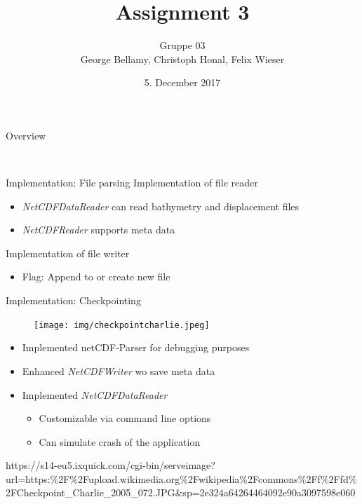 \documentclass[shortpres]{beamer}
\title[{Tsunami simulation}]{Assignment 3}
\author[Bellamy, Honal, Wieser]{Gruppe 03\\George Bellamy, Christoph Honal, Felix Wieser\\\vspace{10pt}{\small Bachelorpraktikum}}
\institute[TU M\"unchen]{Technical University of Munich}
\date{5. December 2017}
\begin{document}
\maketitle

\begin{frame}{Overview}
	\begin{figure}
		\hspace{40pt}
		\hspace{0pt}\vspace{20pt}\\
	\end{figure}
\end{frame}

\begin{frame}{Implementation: File parsing}
	Implementation of file reader
	\begin{itemize}
		\item \textit{NetCDFDataReader} can read bathymetry and displacement files
		\item \textit{NetCDFReader} supports meta data
	\end{itemize}
	\vspace{20pt}
	Implementation of file writer
	\begin{itemize}
		\item Flag: Append to or create new file
	\end{itemize}
\end{frame}

\begin{frame}{Implementation: Checkpointing}	
	\begin{figure}
		\texttt{[image: img/checkpointcharlie.jpeg]}
	\end{figure}
	
	\begin{itemize}
		\item Implemented netCDF-Parser for debugging purposes
		\item Enhanced \textit{NetCDFWriter} wo save meta data
		\item Implemented \textit{NetCDFDataReader}
		\begin{itemize}
			\item Customizable via command line options
			\item Can simulate crash of the application
		\end{itemize}
	\end{itemize}
	
	\vfill
	\flushleft
	{\fontsize{3.5}{3.5} \selectfont 
	https://s14-eu5.ixquick.com/cgi-bin/serveimage?url=https:\%2F\%2Fupload.wikimedia.org\%2Fwikipedia\%2Fcommons\%2Ff\%2Ffd\%2FCheckpoint\_Charlie\_2005\_072.JPG\&sp=2e324a64264464092e90a3097598e060}
\end{frame}
\end{document}
